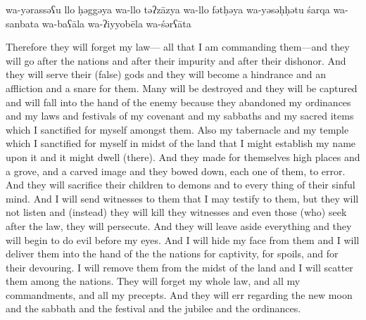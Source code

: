 \begin{transliteration}
    wa-yərassəʕu llo ḥəggəya
    wa-llo təʔzāzya wa-llo fətḥəya wa-yəsəḥḥətu śarqa wa-sanbata
    wa-baʕāla wa-ʔiyyobēla wa-śərʕāta
\end{transliteration}

\begin{translation}
    Therefore they will forget my law---%
    all that I am commanding them---and they will go after the nations and after
    their impurity and after their dishonor. And they will serve their (false) gods
    and they will become a hindrance and an affliction and a snare for them.
    Many will be destroyed and they will be captured and will fall into
    the hand of the enemy because they abandoned my ordinances and my laws and festivals of 
    my covenant and my sabbaths and my sacred items which I sanctified for myself amongst them.
    Also my tabernacle and my temple which I sanctified for myself in midst of
    the land that I might establish my name upon it and it might dwell (there).
    And they made
    for themselves high places and a grove, and a carved image and they bowed down, each one of them,
    to error. And they will sacrifice their children to demons and to every thing
    of their sinful mind.
    And I will send witnesses to them that
    I may testify to them, but they will not listen and (instead) they will kill they witnesses and even
    those (who) seek after the law, they will persecute. And they will leave aside everything and they will begin to do
    evil before my eyes.
    And I will hide my face
    from them and I will deliver them into the hand of the the nations for captivity,
    for spoils, and for their devouring. I will remove them from the midst of the land
    and I will scatter them among the nations.
    They will forget my whole law,
    and all my commandments, and all my precepts. And they will err regarding the new moon and the sabbath
    and the festival and the jubilee and the ordinances.
\end{translation}